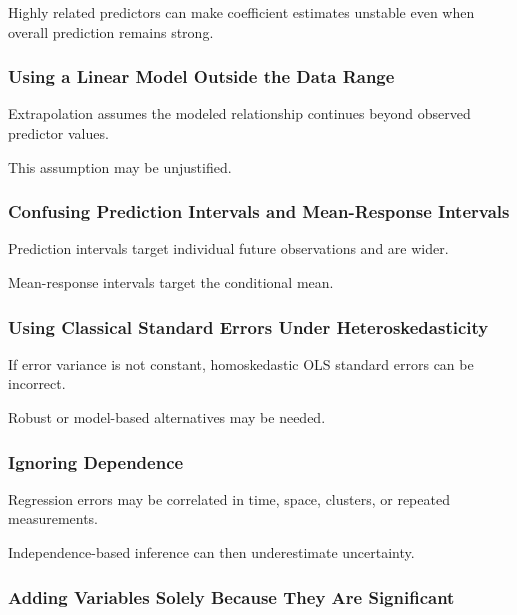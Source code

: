 Highly related predictors can make coefficient estimates unstable even
when overall prediction remains strong.

\subsubsection{Using a Linear Model Outside the Data Range}

Extrapolation assumes the modeled relationship continues beyond observed
predictor values.

This assumption may be unjustified.

\subsubsection{Confusing Prediction Intervals and Mean-Response Intervals}

Prediction intervals target individual future observations and are
wider.

Mean-response intervals target the conditional mean.

\subsubsection{Using Classical Standard Errors Under Heteroskedasticity}

If error variance is not constant, homoskedastic OLS standard errors can
be incorrect.

Robust or model-based alternatives may be needed.

\subsubsection{Ignoring Dependence}

Regression errors may be correlated in time, space, clusters, or repeated
measurements.

Independence-based inference can then underestimate uncertainty.

\subsubsection{Adding Variables Solely Because They Are Significant}

